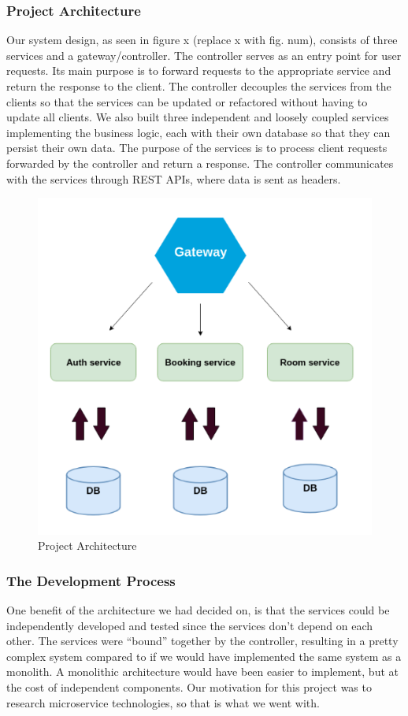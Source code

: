 \subsubsection{Project Architecture}
Our system design, as seen in figure x (replace x with fig. num), consists of three services and a gateway/controller. The controller serves as an entry point for user requests. Its main purpose is to forward requests to the appropriate service and return the response to the client. The controller decouples the services from the clients so that the services can be updated or refactored without having to update all clients. We also built three independent and loosely coupled services implementing the business logic, each with their own database so that they can persist their own data. The purpose of the services is to process client requests forwarded by the controller and return a response. The controller communicates with the services through REST APIs, where data is sent as headers.

\begin{figure}[ht]
  \centering
  \includegraphics[scale=0.8]{figs/projectArchitecture.png}
  \caption{Project Architecture}
  \label{fig:projectarch}
\end{figure}
\newpage
\subsubsection{The Development Process}
One benefit of the architecture we had decided on, is that the services could be independently developed and tested since the services don’t depend on each other. The services were “bound” together by the controller, resulting in a pretty complex system compared to if we would have implemented the same system as a monolith. A monolithic architecture would have been easier to implement, but at the cost of independent components. Our motivation for this project was to research microservice technologies, so that is what we went with. \\
\newline

